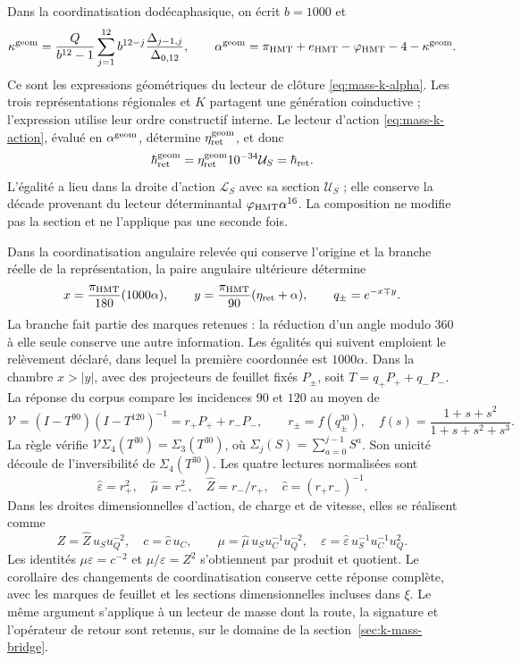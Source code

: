 Dans la coordinatisation dodécaphasique, on écrit \(b=1000\) et
\begin{equation}
 \kappa^{\rm geom}=
 \frac{Q}{b^{12}-1}\sum_{j=1}^{12}
 b^{12-j}\frac{\Delta_{j-1,j}}{\Delta_{0,12}},
 \qquad
 \alpha^{\rm geom}=\pi_{\rm HMT}+e_{\rm HMT}
 -\varphi_{\rm HMT}-4-\kappa^{\rm geom}.
 \label{eq:compat-alpha-geometrica}
\end{equation}
Ce sont les expressions géométriques du lecteur de clôture \eqref{eq:mass-k-alpha}. Les trois représentations régionales et \(K\) partagent une génération coinductive ; l'expression utilise leur ordre constructif interne. Le lecteur d'action \eqref{eq:mass-k-action}, évalué en \(\alpha^{\rm geom}\), détermine \(\eta_{\rm ret}^{\rm geom}\), et donc
\[
 \hbar_{\rm ret}^{\rm geom}
 =\eta_{\rm ret}^{\rm geom}10^{-34}\mathcal U_S
 =\hbar_{\rm ret}.
\]
L’égalité a lieu dans la droite d’action \(\mathcal L_S\)
avec sa section \(\mathcal U_S\) ; elle conserve la décade provenant
du lecteur déterminantal \(\varphi_{\rm HMT}\alpha^{16}\).
La composition ne modifie pas la section et ne l’applique pas une seconde fois.

Dans la coordinatisation angulaire relevée qui conserve l'origine et la branche réelle de la représentation, la paire angulaire ultérieure détermine
\[
 x=\frac{\pi_{\rm HMT}}{180}(1000\alpha),\qquad
 y=\frac{\pi_{\rm HMT}}{90}(\eta_{\rm ret}+\alpha),\qquad
 q_\pm=e^{-x\mp y}.
\]
La branche fait partie des marques retenues : la réduction d'un angle modulo \(360\) à elle seule conserve une autre information. Les égalités qui suivent emploient le relèvement déclaré, dans lequel la première coordonnée est \(1000\alpha\).
Dans la chambre \(x>|y|\), avec des projecteurs de feuillet fixés \(P_\pm\), soit \(T=q_+P_++q_-P_-\). La réponse du corpus compare les incidences \(90\) et \(120\) au moyen de
\[
 \mathcal V=(I-T^{90})(I-T^{120})^{-1}
 =r_+P_++r_-P_-,\qquad
 r_\pm=f(q_\pm^{30}),\quad
 f(s)=\frac{1+s+s^2}{1+s+s^2+s^3}.
\]
La règle vérifie
\(\mathcal V\Sigma_4(T^{30})=\Sigma_3(T^{30})\), où
\(\Sigma_j(S)=\sum_{a=0}^{j-1}S^a\). Son unicité découle
de l’inversibilité de \(\Sigma_4(T^{30})\).
Les quatre lectures normalisées sont
\[
 \widehat\varepsilon=r_+^2,\quad
 \widehat\mu=r_-^2,\quad
 \widehat Z=r_-/r_+,\quad
 \widehat c=(r_+r_-)^{-1}.
\]
Dans les droites dimensionnelles d’action, de charge et de vitesse, elles se réalisent comme
\[
 Z=\widehat Z\,u_Su_Q^{-2},\quad c=\widehat c\,u_C,
 \qquad
 \mu=\widehat\mu\,u_Su_C^{-1}u_Q^{-2},\quad
 \varepsilon=\widehat\varepsilon\,u_S^{-1}u_C^{-1}u_Q^2.
\]
Les identités \(\mu\varepsilon=c^{-2}\) et \(\mu/\varepsilon=Z^2\) s'obtiennent par produit et quotient. Le corollaire des changements de coordinatisation conserve cette réponse complète, avec les marques de feuillet et les sections dimensionnelles incluses dans \(\xi\). Le même argument s'applique à un lecteur de masse dont la route, la signature et l'opérateur de retour sont retenus, sur le domaine de la section~\ref{sec:k-mass-bridge}.

